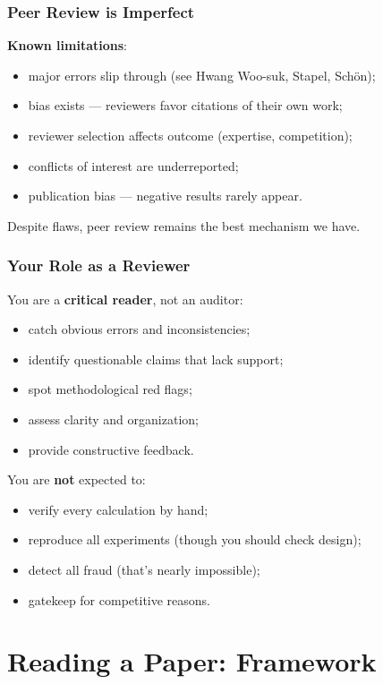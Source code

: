 \documentclass[]{beamer}
\begin{document}
\begin{frame}[fragile]
\frametitle{Peer Review is Imperfect}
\textbf{Known limitations}:
\begin{itemize}
  \item major errors slip through (see Hwang Woo-suk, Stapel, Schön);
  \item bias exists — reviewers favor citations of their own work;
  \item reviewer selection affects outcome (expertise, competition);
  \item conflicts of interest are underreported;
  \item publication bias — negative results rarely appear.
\end{itemize}

Despite flaws, peer review remains the best mechanism we have.

\end{frame}

\begin{frame}[fragile]
\frametitle{Your Role as a Reviewer}
You are a \textbf{critical reader}, not an auditor:
\begin{itemize}
  \item catch obvious errors and inconsistencies;
  \item identify questionable claims that lack support;
  \item spot methodological red flags;
  \item assess clarity and organization;
  \item provide constructive feedback.
\end{itemize}

You are \textbf{not} expected to:
\begin{itemize}
  \item verify every calculation by hand;
  \item reproduce all experiments (though you should check design);
  \item detect all fraud (that's nearly impossible);
  \item gatekeep for competitive reasons.
\end{itemize}

\end{frame}

\section{Reading a Paper: Framework}
\end{document}
